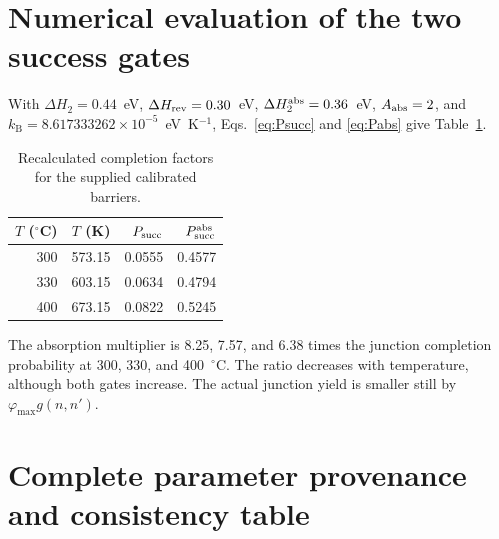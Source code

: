 \documentclass[11pt,a4paper]{article}
\newcommand{\kb}{k_{\mathrm B}}
\begin{document}
\section{Numerical evaluation of the two success gates}
\label{sec:numerics}

With $\Delta H_2=0.44$~eV, $\Delta H_{\rm rev}=0.30$~eV,
$\Delta H_2^{\rm abs}=0.36$~eV, $A_{\rm abs}=2$, and
$\kb=8.617333262\times10^{-5}$~eV~K$^{-1}$,
Eqs.~\eqref{eq:Psucc} and \eqref{eq:Pabs} give Table~\ref{tab:gates}.

\begin{table}[ht]
\centering
\caption{Recalculated completion factors for the supplied calibrated barriers.}
\label{tab:gates}
\begin{tabular}{rrrr}
\toprule
$T$ ($^\circ$C) & $T$ (K) & $P_{\rm succ}$ & $P_{\rm succ}^{\rm abs}$ \\
\midrule
300 & 573.15 & 0.0555 & 0.4577 \\
330 & 603.15 & 0.0634 & 0.4794 \\
400 & 673.15 & 0.0822 & 0.5245 \\
\bottomrule
\end{tabular}
\end{table}

The absorption multiplier is 8.25, 7.57, and 6.38 times the junction completion
probability at 300, 330, and 400~$^\circ$C.  The ratio decreases with temperature,
although both gates increase.  The actual junction yield is smaller still by
$\varphi_{\max}g(n,n')$.

\section{Complete parameter provenance and consistency table}
\label{sec:data}
\end{document}
